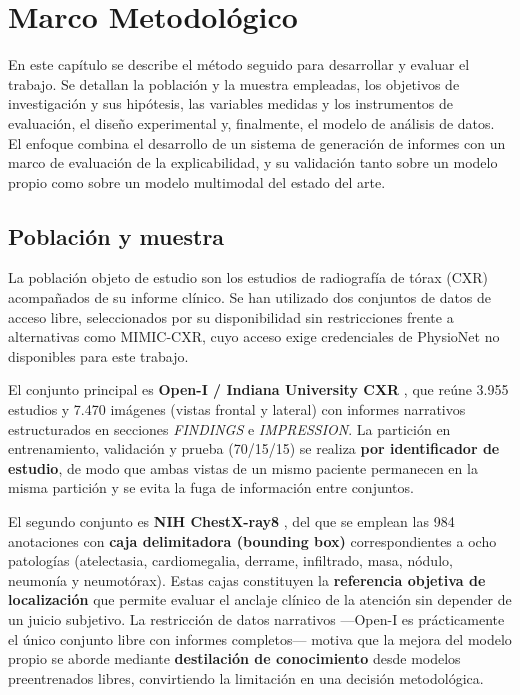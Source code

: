 \chapter{Marco Metodológico}

En este capítulo se describe el método seguido para desarrollar y evaluar el trabajo. Se
detallan la población y la muestra empleadas, los objetivos de investigación y sus hipótesis,
las variables medidas y los instrumentos de evaluación, el diseño experimental y, finalmente,
el modelo de análisis de datos. El enfoque combina el desarrollo de un sistema de generación de
informes con un marco de evaluación de la explicabilidad, y su validación tanto sobre un modelo
propio como sobre un modelo multimodal del estado del arte.

\section{Población y muestra}
La población objeto de estudio son los estudios de radiografía de tórax (CXR) acompañados de su
informe clínico. Se han utilizado dos conjuntos de datos de acceso libre, seleccionados por su
disponibilidad sin restricciones frente a alternativas como MIMIC-CXR, cuyo acceso exige
credenciales de PhysioNet no disponibles para este trabajo.

El conjunto principal es \textbf{Open-I / Indiana University CXR} \parencite{demnerfushman2016},
que reúne 3.955 estudios y 7.470 imágenes (vistas frontal y lateral) con informes narrativos
estructurados en secciones \textit{FINDINGS} e \textit{IMPRESSION}. La partición en
entrenamiento, validación y prueba (70/15/15) se realiza \textbf{por identificador de estudio},
de modo que ambas vistas de un mismo paciente permanecen en la misma partición y se evita la
fuga de información entre conjuntos.

El segundo conjunto es \textbf{NIH ChestX-ray8} \parencite{wang2017}, del que se emplean las 984
anotaciones con \textbf{caja delimitadora (bounding box)} correspondientes a ocho patologías
(atelectasia, cardiomegalia, derrame, infiltrado, masa, nódulo, neumonía y neumotórax). Estas
cajas constituyen la \textbf{referencia objetiva de localización} que permite evaluar el anclaje
clínico de la atención sin depender de un juicio subjetivo. La restricción de datos narrativos
—Open-I es prácticamente el único conjunto libre con informes completos— motiva que la mejora
del modelo propio se aborde mediante \textbf{destilación de conocimiento} desde modelos
preentrenados libres, convirtiendo la limitación en una decisión metodológica.

